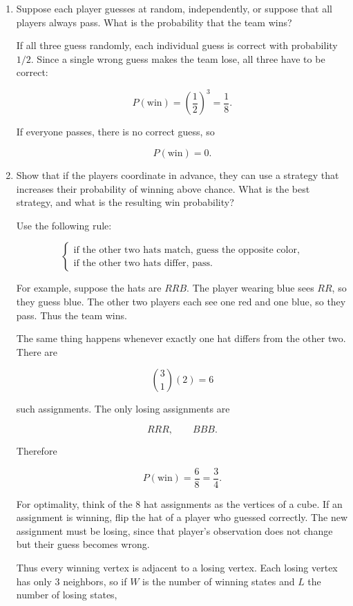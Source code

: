 \documentclass[11pt]{article}
\begin{document}
\begin{enumerate}

\item Suppose each player guesses at random, independently, or suppose
that all players always pass. What is the probability that the team wins?

If all three guess randomly, each individual guess is correct with
probability \(1/2\). Since a single wrong guess makes the team lose, all
three have to be correct:

\[
P(\text{win})
=
\left(\frac12\right)^3
=
\frac18.
\]

If everyone passes, there is no correct guess, so

\[
P(\text{win})=0.
\]

\item Show that if the players coordinate in advance, they can use a
strategy that increases their probability of winning above chance.
What is the best strategy, and what is the resulting win probability?

Use the following rule:

\[
\begin{cases}
\text{if the other two hats match, guess the opposite color},\\
\text{if the other two hats differ, pass}.
\end{cases}
\]

For example, suppose the hats are \(RRB\). The player wearing blue sees
\(RR\), so they guess blue. The other two players each see one red and one
blue, so they pass. Thus the team wins.

The same thing happens whenever exactly one hat differs from the other two.
There are

\[
\binom31(2)=6
\]

such assignments. The only losing assignments are

\[
RRR,\qquad BBB.
\]

Therefore

\[
P(\text{win})=\frac68=\frac34.
\]

For optimality, think of the \(8\) hat assignments as the vertices of a cube.
If an assignment is winning, flip the hat of a player who guessed correctly.
The new assignment must be losing, since that player's observation does not
change but their guess becomes wrong.

Thus every winning vertex is adjacent to a losing vertex. Each losing vertex
has only \(3\) neighbors, so if \(W\) is the number of winning states and
\(L\) the number of losing states,


\end{enumerate}
\end{document}
